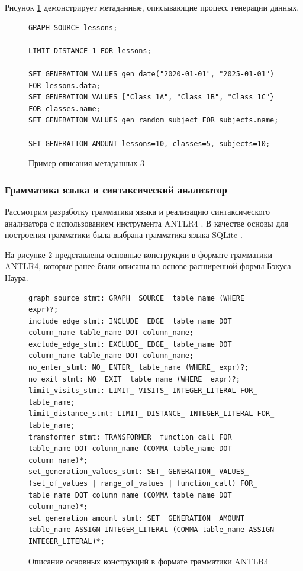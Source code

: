 Рисунок \ref{metadata-example-3} демонстрирует метаданные, описывающие процесс генерации данных.

\begin{figure}
  \begin{lstlisting}
GRAPH SOURCE lessons;

LIMIT DISTANCE 1 FOR lessons;

SET GENERATION VALUES gen_date("2020-01-01", "2025-01-01") FOR lessons.data;
SET GENERATION VALUES ["Class 1A", "Class 1B", "Class 1C"} FOR classes.name;
SET GENERATION VALUES gen_random_subject FOR subjects.name;

SET GENERATION AMOUNT lessons=10, classes=5, subjects=10;
  \end{lstlisting}
  \caption{Пример описания метаданных 3}
  \label{metadata-example-3}
\end{figure}

\subsubsection{Грамматика языка и синтаксический анализатор}
Рассмотрим разработку грамматики языка и реализацию синтаксического анализатора \cite{parsers} с использованием инструмента ANTLR4 \cite{antlr}. В качестве основы для построения грамматики была выбрана грамматика языка SQLite \cite{sqlite-parser}.

На рисунке \ref{antlr4-grammar} представлены основные конструкции в формате грамматики ANTLR4, которые ранее были описаны на основе расширенной формы Бэкуса-Наура.

\begin{figure}
  \begin{lstlisting}
graph_source_stmt: GRAPH_ SOURCE_ table_name (WHERE_ expr)?;
include_edge_stmt: INCLUDE_ EDGE_ table_name DOT column_name table_name DOT column_name;
exclude_edge_stmt: EXCLUDE_ EDGE_ table_name DOT column_name table_name DOT column_name;
no_enter_stmt: NO_ ENTER_ table_name (WHERE_ expr)?;
no_exit_stmt: NO_ EXIT_ table_name (WHERE_ expr)?;
limit_visits_stmt: LIMIT_ VISITS_ INTEGER_LITERAL FOR_ table_name;
limit_distance_stmt: LIMIT_ DISTANCE_ INTEGER_LITERAL FOR_ table_name;
transformer_stmt: TRANSFORMER_ function_call FOR_ table_name DOT column_name (COMMA table_name DOT column_name)*;
set_generation_values_stmt: SET_ GENERATION_ VALUES_ (set_of_values | range_of_values | function_call) FOR_ table_name DOT column_name (COMMA table_name DOT column_name)*;
set_generation_amount_stmt: SET_ GENERATION_ AMOUNT_ table_name ASSIGN INTEGER_LITERAL (COMMA table_name ASSIGN INTEGER_LITERAL)*;
  \end{lstlisting}
  \caption{Описание основных конструкций в формате грамматики ANTLR4}
  \label{antlr4-grammar}
\end{figure}

